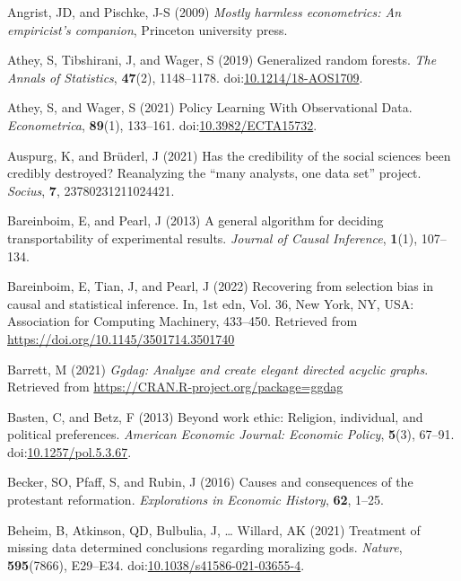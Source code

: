 \documentclass[
  singlecolumn]{article}
\newlength{\cslhangindent}
\newenvironment{CSLReferences}[2] %
 {\begin{list}{}{%
  \setlength{\itemindent}{0pt}
  \setlength{\leftmargin}{0pt}
  \setlength{\parsep}{0pt}
  \ifodd #1
   \setlength{\leftmargin}{\cslhangindent}
   \setlength{\itemindent}{-1\cslhangindent}
  \fi
  \setlength{\itemsep}{#2\baselineskip}}}
 {\end{list}}
\begin{document}
\label{refs}
\begin{CSLReferences}{1}{0}
Angrist, JD, and Pischke, J-S (2009) \emph{Mostly harmless econometrics:
An empiricist's companion}, Princeton university press.

Athey, S, Tibshirani, J, and Wager, S (2019) Generalized random forests.
\emph{The Annals of Statistics}, \textbf{47}(2), 1148--1178.
doi:\href{https://doi.org/10.1214/18-AOS1709}{10.1214/18-AOS1709}.

Athey, S, and Wager, S (2021) Policy Learning With Observational Data.
\emph{Econometrica}, \textbf{89}(1), 133--161.
doi:\href{https://doi.org/10.3982/ECTA15732}{10.3982/ECTA15732}.

Auspurg, K, and Brüderl, J (2021) Has the credibility of the social
sciences been credibly destroyed? Reanalyzing the {``many analysts, one
data set''} project. \emph{Socius}, \textbf{7}, 23780231211024421.

Bareinboim, E, and Pearl, J (2013) A general algorithm for deciding
transportability of experimental results. \emph{Journal of Causal
Inference}, \textbf{1}(1), 107--134.

Bareinboim, E, Tian, J, and Pearl, J (2022) Recovering from selection
bias in causal and statistical inference. In, 1st edn, Vol. 36, New
York, NY, USA: Association for Computing Machinery, 433--450. Retrieved
from \url{https://doi.org/10.1145/3501714.3501740}

Barrett, M (2021) \emph{Ggdag: Analyze and create elegant directed
acyclic graphs}. Retrieved from
\url{https://CRAN.R-project.org/package=ggdag}

Basten, C, and Betz, F (2013) Beyond work ethic: Religion, individual,
and political preferences. \emph{American Economic Journal: Economic
Policy}, \textbf{5}(3), 67--91.
doi:\href{https://doi.org/10.1257/pol.5.3.67}{10.1257/pol.5.3.67}.

Becker, SO, Pfaff, S, and Rubin, J (2016) Causes and consequences of the
protestant reformation. \emph{Explorations in Economic History},
\textbf{62}, 1--25.

Beheim, B, Atkinson, QD, Bulbulia, J, \ldots{} Willard, AK (2021)
Treatment of missing data determined conclusions regarding moralizing
gods. \emph{Nature}, \textbf{595}(7866), E29--E34.
doi:\href{https://doi.org/10.1038/s41586-021-03655-4}{10.1038/s41586-021-03655-4}.


\end{CSLReferences}
\end{document}
